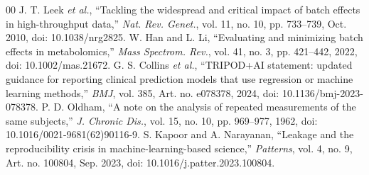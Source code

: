 \documentclass[conference]{IEEEtran}
\begin{document}
\begin{thebibliography}{00}
 J. T. Leek \textit{et al.}, ``Tackling the widespread and critical impact of batch effects in high-throughput data,'' \textit{Nat. Rev. Genet.}, vol. 11, no. 10, pp. 733--739, Oct. 2010, doi: 10.1038/nrg2825.
 W. Han and L. Li, ``Evaluating and minimizing batch effects in metabolomics,'' \textit{Mass Spectrom. Rev.}, vol. 41, no. 3, pp. 421--442, 2022, doi: 10.1002/mas.21672.
 G. S. Collins \textit{et al.}, ``TRIPOD+AI statement: updated guidance for reporting clinical prediction models that use regression or machine learning methods,'' \textit{BMJ}, vol. 385, Art. no. e078378, 2024, doi: 10.1136/bmj-2023-078378.
 P. D. Oldham, ``A note on the analysis of repeated measurements of the same subjects,'' \textit{J. Chronic Dis.}, vol. 15, no. 10, pp. 969--977, 1962, doi: 10.1016/0021-9681(62)90116-9.
 S. Kapoor and A. Narayanan, ``Leakage and the reproducibility crisis in machine-learning-based science,'' \textit{Patterns}, vol. 4, no. 9, Art. no. 100804, Sep. 2023, doi: 10.1016/j.patter.2023.100804.
\end{thebibliography}
\end{document}
